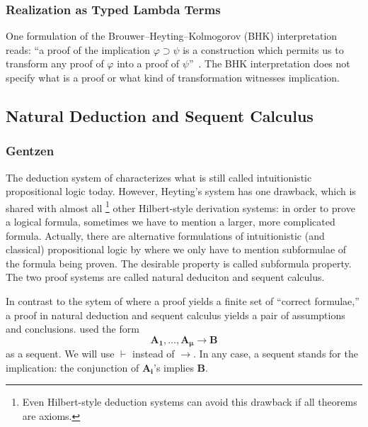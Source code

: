\subsubsection{Realization as Typed Lambda Terms}

One formulation of the
Brouwer--Heyting--Kolmogorov
(BHK)
interpretation reads: ``a proof of the
implication $\varphi\supset\psi$ is a construction which permits us to
 transform any proof of $\varphi$ into a proof of $\psi$''~\cite[Ch.~1, 3.1.]{troelstra1988constructivism}.
The BHK
interpretation does not specify what is a proof or what kind of
transformation witnesses implication.


\subsection{Natural Deduction and Sequent Calculus}

\subsubsection{Gentzen}

The deduction system of \citet{heyting1930} characterizes what is still
called intuitionistic propositional logic today. However, Heyting's
system has one drawback, which is shared with almost all%
\footnote{Even Hilbert-style deduction
systems can avoid this drawback if all theorems are axioms.} other
Hilbert-style derivation systems:
in order to prove a logical formula, sometimes we have to
mention a larger, more complicated formula.  Actually, there
are alternative formulations of intuitionistic (and classical)
propositional logic by \citet{gentzen} where we only have to
mention subformulae of the formula being proven.
The desirable property is called subformula property.
The two proof systems are called natural deduciton and sequent calculus.

In contrast to the sytem of \citet{heyting1930} where a proof yields a
finite set of ``correct formulae,'' a proof in natural deduction and
sequent calculus yields a pair of assumptions and conclusions.
\citet{gentzen} used the form
\[
 \mathbf{A_1},\ldots,\mathbf{A_{\boldsymbol\mu}}\longrightarrow \mathbf{B}
\]
as a sequent.  We will use $\vdash$ instead of $\longrightarrow$.
In any case, a sequent stands for the implication:
the conjunction of $\mathbf{A_i}$'s implies $\mathbf{B}$.

